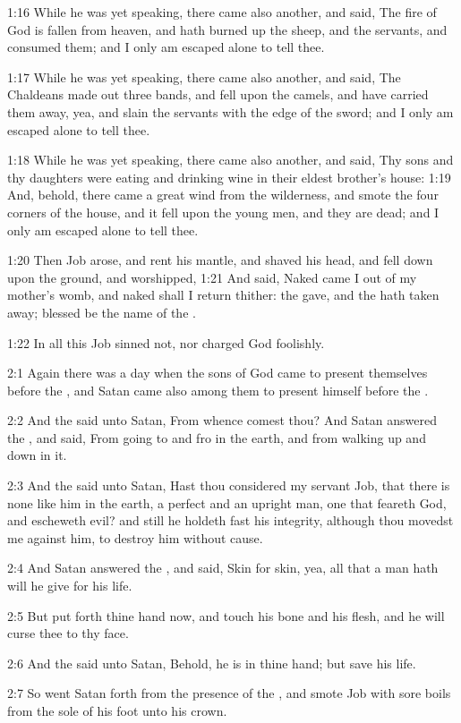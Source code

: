 1:16 While he was yet speaking, there came also another, and said, The fire of God is fallen from heaven, and hath burned up the sheep, and the servants, and consumed them; and I only am escaped alone to tell thee.

1:17 While he was yet speaking, there came also another, and said, The Chaldeans made out three bands, and fell upon the camels, and have carried them away, yea, and slain the servants with the edge of the sword; and I only am escaped alone to tell thee.

1:18 While he was yet speaking, there came also another, and said, Thy sons and thy daughters were eating and drinking wine in their eldest brother's house: 1:19 And, behold, there came a great wind from the wilderness, and smote the four corners of the house, and it fell upon the young men, and they are dead; and I only am escaped alone to tell thee.

1:20 Then Job arose, and rent his mantle, and shaved his head, and fell down upon the ground, and worshipped, 1:21 And said, Naked came I out of my mother's womb, and naked shall I return thither: the \LORD gave, and the \LORD hath taken away; blessed be the name of the \LORD.

1:22 In all this Job sinned not, nor charged God foolishly.

2:1 Again there was a day when the sons of God came to present themselves before the \LORD, and Satan came also among them to present himself before the \LORD.

2:2 And the \LORD said unto Satan, From whence comest thou? And Satan answered the \LORD, and said, From going to and fro in the earth, and from walking up and down in it.

2:3 And the \LORD said unto Satan, Hast thou considered my servant Job, that there is none like him in the earth, a perfect and an upright man, one that feareth God, and escheweth evil? and still he holdeth fast his integrity, although thou movedst me against him, to destroy him without cause.

2:4 And Satan answered the \LORD, and said, Skin for skin, yea, all that a man hath will he give for his life.

2:5 But put forth thine hand now, and touch his bone and his flesh, and he will curse thee to thy face.

2:6 And the \LORD said unto Satan, Behold, he is in thine hand; but save his life.

2:7 So went Satan forth from the presence of the \LORD, and smote Job with sore boils from the sole of his foot unto his crown.

